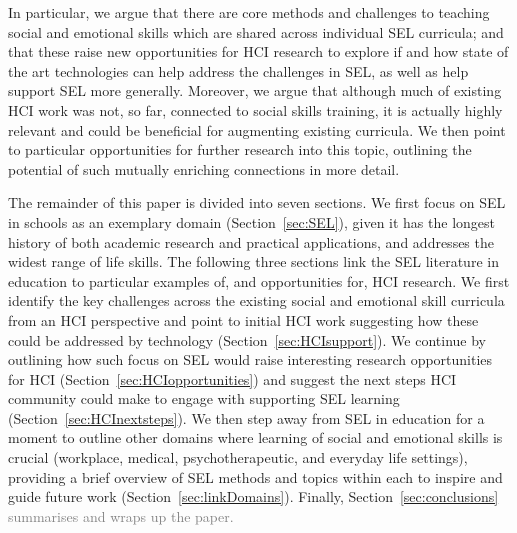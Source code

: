 \documentclass[prodmode,acmtochi]{acmsmall}
\newcommand{\todolater}[1]{}
\newcommand{\rephrase}[1]{\textrm{\textrm{\textcolor{gray}{#1}}}}
\begin{document}
In particular, we argue that there are core methods and challenges to teaching social and emotional skills which are shared across individual SEL curricula; and that these raise new opportunities for HCI research to explore if and how state of the art technologies can help address the challenges in SEL, as well as help support SEL more generally.
%
%
Moreover, we argue that although much of existing HCI work was not, so far, connected to social skills training, it is actually highly relevant and could be beneficial for augmenting existing curricula.
%
We then point to particular opportunities for further research into this topic, outlining the potential of such mutually enriching connections in more detail. 



The remainder of this paper is divided into seven sections.  We first focus on SEL in schools  as an exemplary domain (Section~\ref{sec:SEL}), given it has the longest history of both academic research and practical applications, and addresses  the widest range of life skills. The following three sections link the SEL literature in education to particular examples of, and opportunities for, HCI research. We first  identify the key challenges across the existing social and emotional skill curricula from an HCI perspective and point to initial HCI work suggesting how these could be addressed by technology (Section~\ref{sec:HCIsupport}). We continue by outlining how such focus on SEL would raise interesting research opportunities for HCI (Section~\ref{sec:HCIopportunities}) and suggest the next steps HCI community could make to engage with supporting SEL learning (Section~\ref{sec:HCInextsteps}). 
We then step away from SEL in education for a moment to outline other domains where learning of social and emotional skills is crucial (workplace, medical, psychotherapeutic, and everyday life settings), providing a brief overview of SEL methods and topics within each to inspire and guide future work (Section~\ref{sec:linkDomains}). Finally, Section~\ref{sec:conclusions} \rephrase{summarises and wraps up the paper.}  
\todolater{Downplay the direct applicability to SEL --> existing work albeit in other topics, makes it plausible that it could support SEL.}

\todolater{Results overview}

\iffalse
\end{document}
